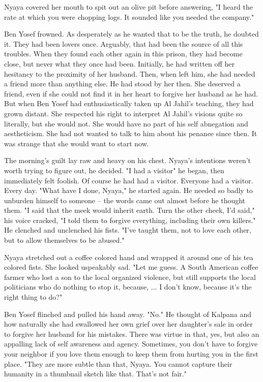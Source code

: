 \documentclass{amsart}
\begin{document}
Nyaya covered her mouth to spit out an olive pit before answering, "I heard the rate at which you were chopping logs. It sounded like you needed the company." 

Ben Yosef frowned. As desperately as he wanted that to be the truth, he doubted it. They had been lovers once. Arguably, that had been the source of all this troubles. When they found each other again in this prison, they had become close, but never what they once had been. Initially, he had written off her hesitancy to the proximity of her husband. Then, when left him, she had needed a friend more than anything else. He had stood by her then. She deserved a friend, even if she could not find it in her heart to forgive her husband as he had. But when Ben Yosef had enthusiastically taken up Al Jahil's teaching, they had grown distant. She respected his right to interpret Al Jahil's visions quite so literally, but she would not. She would have no part of his self abnegation and aestheticism. She had not wanted to talk to him about his penance since then. It was strange that she would want to start now.

The morning's guilt lay raw and heavy on his chest. Nyaya's intentions weren't worth trying to figure out, he decided. "I had a visitor" he began, then immediately felt foolish. Of course he had had a visitor. Everyone had a visitor. Every day. "What have I done, Nyaya," he started again. He needed so badly to unburden himself to someone -- the words came out almost before he thought them. "I said that the meek would inherit earth. Turn the other cheek, I'd said," his voice cracked, "I told them to forgive everything, including their own killers." He clenched and unclenched his fists. "I've taught them, not to love each other, but to allow themselves to be abused."

Nyaya stretched out a coffee colored hand and wrapped it around one of his tea colored fists. She looked uspeakably sad. "Let me guess. A South American coffee farmer who lost a son to the local organized violence, but still supports the local politicians who do nothing to stop it, because, ... I don't know, because it's the right thing to do?"

Ben Yosef flinched and pulled his hand away. "No." He thought of Kalpana and how naturally she had swallowed her own grief over her daughter's sale in order to forgive her husband for his mistakes. There was virtue in that, yes, but also an appalling lack of self awareness and agency. Sometimes, you don't have to forgive your neighbor if you love them enough to keep them from hurting you in the first place. "They are more subtle than that, Nyaya. You cannot capture their humanity in a thumbnail sketch like that. That's not fair." 
\end{document}
